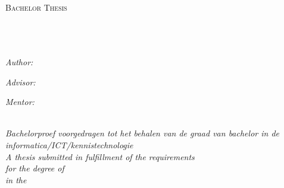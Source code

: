 \documentclass[
10pt, %
twoside, %
english, %
singlespacing, %
headsepline, %
]{BachelorThesis} %
\author{Axel \textsc{Faes}} %
\begin{document}
\frontmatter %

\pagestyle{plain} %


\begin{titlepage}
\begin{center}

\textsc{\LARGE \univname}\\[1.5cm] %

\textsc{\Large Bachelor Thesis}\\[0.5cm] %

\HRule \\[0.4cm] %
{\huge \bfseries \ttitle}\\[0.4cm] %
\HRule \\[1cm] %
 
\begin{minipage}{0.4\textwidth}
\begin{flushleft} \large
\emph{Author:}\\
{\authorname} %
\end{flushleft}
\end{minipage}
\begin{minipage}{0.4\textwidth}
\begin{flushright} \large
\emph{Advisor:} \\
{\adname} %

\emph{Mentor:} \\
{\supname} %
\end{flushright}
\end{minipage}\\[1cm]
 
\large \textit{Bachelorproef voorgedragen tot het behalen van de graad van bachelor in de informatica/ICT/kennistechnologie}\\[0.3cm]
\large \textit{A thesis submitted in fulfillment of the requirements\\ for the degree of \degreename}\\[0.3cm] %
\textit{in the}\\[0.4cm]
\groupname\\\deptname\\[0.5cm] %
 

\end{center}
\end{titlepage}
\end{document}
